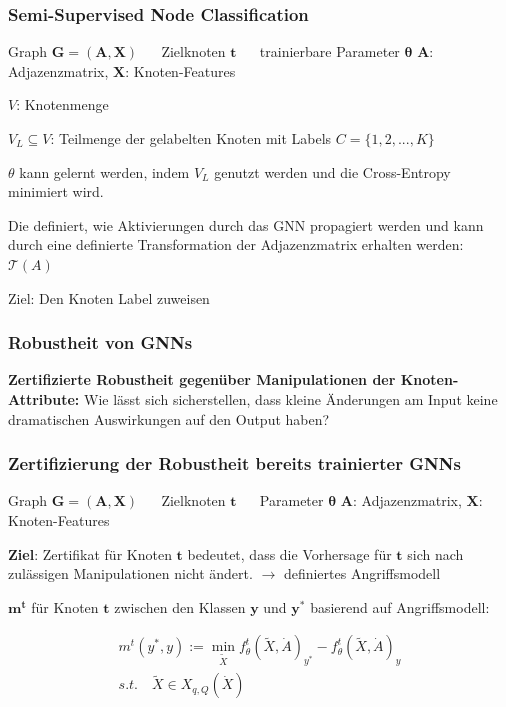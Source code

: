 \documentclass{beamer}
\begin{document}
\begin{frame}
  \frametitle{Semi-Supervised Node Classification}

  Graph $\boldsymbol{G} = (\boldsymbol{A}, \boldsymbol{X})$ $\quad$ Zielknoten $\boldsymbol{t}$ $\quad$ trainierbare Parameter $\boldsymbol{\theta}$\newline
  $\boldsymbol{A}$: Adjazenzmatrix, $\boldsymbol{X}$: Knoten-Features\newline

  $V$: Knotenmenge

  $V_L \subseteq V$: Teilmenge der gelabelten Knoten mit Labels $C = \{1, 2, ..., K\}$

  $\theta$ kann gelernt werden, indem $V_L$ genutzt werden und die Cross-Entropy minimiert wird.

  Die  definiert, wie Aktivierungen durch das GNN propagiert werden und kann durch eine
  definierte Transformation der Adjazenzmatrix erhalten werden: $\mathcal{T}(A)$

  Ziel: Den Knoten Label zuweisen

\end{frame}


\begin{frame}
  \frametitle{Robustheit von GNNs}
  \textbf{Zertifizierte Robustheit gegenüber Manipulationen der Knoten-Attribute:}\newline
  Wie lässt sich sicherstellen, dass kleine Änderungen am Input keine dramatischen Auswirkungen auf den Output haben?
\end{frame}

\begin{frame}
  \frametitle{Zertifizierung der Robustheit bereits trainierter GNNs}

  Graph $\boldsymbol{G} = (\boldsymbol{A}, \boldsymbol{X})$ $\quad$ Zielknoten $\boldsymbol{t}$ $\quad$ Parameter $\boldsymbol{\theta}$\newline
  $\boldsymbol{A}$: Adjazenzmatrix, $\boldsymbol{X}$: Knoten-Features\newline

  \textbf{Ziel}: Zertifikat für Knoten $\boldsymbol{t}$ bedeutet, dass die Vorhersage für $\boldsymbol{t}$ sich nach zulässigen Manipulationen nicht ändert.\newline
  $\rightarrow$ definiertes Angriffsmodell\newline

   $\boldsymbol{m^t}$ für Knoten $\boldsymbol{t}$ zwischen den Klassen $\boldsymbol{y}$ und $\boldsymbol{y^{\ast}}$ 
  basierend auf Angriffsmodell:

  \begin{gather} 
        m^t (y^*, y) := \min_{\tilde{X}} f_{\theta}^t(\tilde{X}, \dot{A})_{y^*} - f_{\theta}^t(\tilde{X}, \dot{A})_y \nonumber \\
        s.t. \quad \tilde{X} \in X_{q, Q} (\dot{X}) \nonumber
    \end{gather}
\end{frame}
\end{document}
